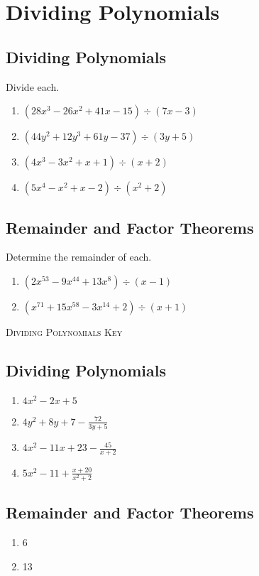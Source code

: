 \chapter{Dividing Polynomials}

\section{Dividing Polynomials}

Divide each.
\begin{enumerate}
    \item $(28x^3-26x^2+41x-15) \div (7x-3)$
    \item $(44y^2+12y^3+61y-37) \div (3y+5)$
    \item $\left(4x^3 - 3x^2 + x + 1\right) \div (x + 2)$
    \item $\left(5x^4 - x^2 + x - 2\right) \div (x^2 + 2)$
\end{enumerate}

\section{Remainder and Factor Theorems}

Determine the remainder of each.
\begin{enumerate}
	\item $\left(2x^{53} - 9x^{44} + 13x^8\right) \div (x - 1)$
	\item $\left(x^{71} + 15x^{58} - 3x^{14} + 2\right) \div (x + 1)$
\end{enumerate}

\newpage

\textsc{Dividing Polynomials Key}

\section*{Dividing Polynomials}

\begin{enumerate}
    \item $4x^2-2x+5$
    \item $4y^2+8y+7-\frac{72}{3y+5}$
    \item $4x^2 - 11x + 23 - \frac{45}{x+2}$
    \item $5x^2 - 11 + \frac{x+20}{x^2+2}$
\end{enumerate}

\section*{Remainder and Factor Theorems}

\begin{enumerate}
	\item 6
	\item 13
\end{enumerate}
